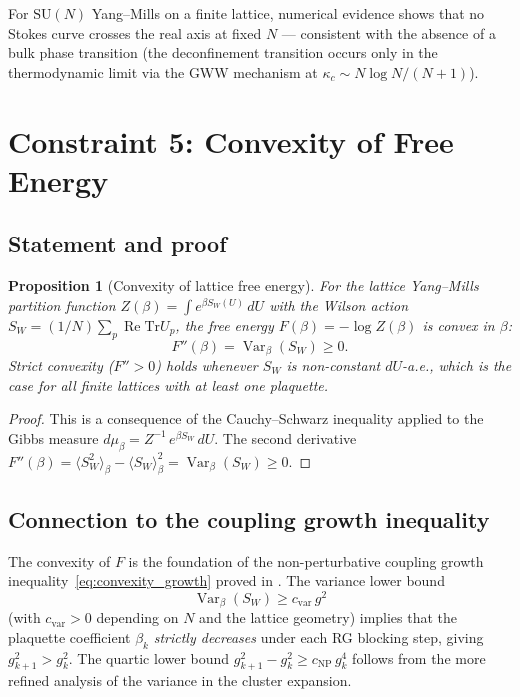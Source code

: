 \documentclass[12pt]{article}
\newtheorem{proposition}[theorem]{Proposition}
\theoremstyle{definition}
\theoremstyle{remark}
\newcommand{\SU}{\mathrm{SU}}
\newcommand{\Tr}{\mathrm{Tr}}
\newcommand{\re}{\operatorname{Re}}
\newcommand{\Var}{\operatorname{Var}}
\begin{document}
For $\SU(N)$ Yang--Mills on a finite lattice, numerical evidence
\cite{OlbrykPsi2026} shows that no Stokes curve crosses the
real axis at fixed $N$ --- consistent with the absence of a
bulk phase transition (the deconfinement transition occurs only
in the thermodynamic limit via the GWW mechanism at
$\kappa_c \sim N\log N/(N+1)$).

\section{Constraint 5: Convexity of Free Energy}
\label{sec:convexity}

\subsection{Statement and proof}

\begin{proposition}[Convexity of lattice free energy]
\label{prop:convexity}
For the lattice Yang--Mills partition function
$Z(\beta) = \int e^{\beta S_W(U)}\,dU$ with the Wilson action
$S_W = (1/N)\sum_p \re\Tr U_p$, the free energy
$F(\beta) = -\log Z(\beta)$ is convex in $\beta$:
\[
  F''(\beta) = \Var_\beta(S_W) \geq 0.
\]
Strict convexity ($F'' > 0$) holds whenever $S_W$ is non-constant
$dU$-a.e., which is the case for all finite lattices with at least
one plaquette.
\end{proposition}

\begin{proof}
This is a consequence of the Cauchy--Schwarz inequality applied
to the Gibbs measure $d\mu_\beta = Z^{-1}\,e^{\beta S_W}\,dU$.
The second derivative $F''(\beta) = \langle S_W^2 \rangle_\beta
- \langle S_W \rangle_\beta^2 = \Var_\beta(S_W) \geq 0$.
\end{proof}

\subsection{Connection to the coupling growth inequality}

The convexity of $F$ is the foundation of the non-perturbative
coupling growth inequality~\eqref{eq:convexity_growth} proved
in \cite{Olbryk2026MG}.  The variance lower bound
\[
  \Var_\beta(S_W) \geq c_{\mathrm{var}}\,g^2
\]
(with $c_{\mathrm{var}} > 0$ depending on $N$ and the lattice
geometry) implies that the plaquette coefficient $\beta_k$
\emph{strictly decreases} under each RG blocking step, giving
$g^2_{k+1} > g^2_k$.  The quartic lower bound
$g^2_{k+1} - g^2_k \geq c_{\mathrm{NP}}\,g^4_k$ follows from
the more refined analysis of the variance in the cluster expansion.
\end{document}
